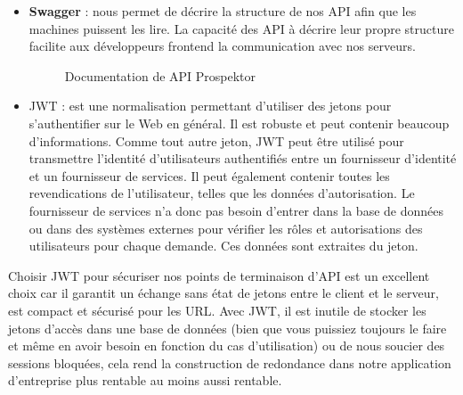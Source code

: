 \begin{itemize}
\begin{itemize}
\item Les d\'eveloppeurs adorent programmer avec Spring Boot. Ils sont plus productifs, b\'en\'eficient des avantages de l'\'ecosyst\`eme Spring et de la tranquillit\'e d'esprit des syst\`emes de production en fonctionnement.
\end{itemize}


\item \textbf{Swagger} : nous permet de d\'ecrire la structure de nos API afin que les machines puissent les lire. La capacit\'e des API \`a d\'ecrire leur propre structure facilite aux d\'eveloppeurs frontend la communication avec nos serveurs.

\begin{figure}[H]
	\caption{\label{fig:my-label} Documentation de API Prospektor}
\end{figure}

\item \gls{JWT} : est une normalisation permettant d'utiliser des jetons pour s'authentifier sur le Web en g\'en\'eral. Il est robuste et peut contenir beaucoup d'informations. Comme tout autre jeton, JWT peut \^etre utilis\'e pour transmettre l'identit\'e d'utilisateurs authentifi\'es entre un fournisseur d'identit\'e et un fournisseur de services. Il peut \'egalement contenir toutes les revendications de l'utilisateur, telles que les donn\'ees d'autorisation. Le fournisseur de services n'a donc pas besoin d'entrer dans la base de donn\'ees ou dans des syst\`emes externes pour v\'erifier les r\^oles et autorisations des utilisateurs pour chaque demande. Ces donn\'ees sont extraites du jeton.

\end{itemize}

Choisir JWT pour s\'ecuriser nos points de terminaison d'API est un excellent choix car il garantit un \'echange sans \'etat de jetons entre le client et le serveur, est compact et s\'ecuris\'e pour les URL. Avec JWT, il est inutile de stocker les jetons d'acc\`es dans une base de donn\'ees (bien que vous puissiez toujours le faire et m\^eme en avoir besoin en fonction du cas d'utilisation) ou de nous soucier des sessions bloqu\'ees, cela rend la construction de redondance dans notre application d'entreprise plus rentable au moins aussi rentable. 


